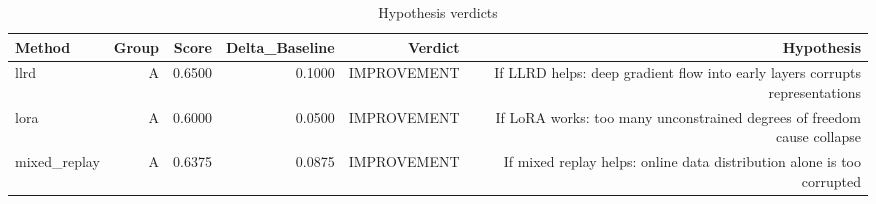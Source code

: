 \begin{table}[htbp]
\centering
\caption{Hypothesis verdicts}
\label{tab:hyp-verdicts}
\begin{tabular}{lrrrrr}
\toprule
\textbf{Method} & \textbf{Group} & \textbf{Score} & \textbf{Delta\_Baseline} & \textbf{Verdict} & \textbf{Hypothesis} \\
\midrule
llrd & A & 0.6500 & 0.1000 & IMPROVEMENT & If LLRD helps: deep gradient flow into early layers corrupts representations \\
lora & A & 0.6000 & 0.0500 & IMPROVEMENT & If LoRA works: too many unconstrained degrees of freedom cause collapse \\
mixed\_replay & A & 0.6375 & 0.0875 & IMPROVEMENT & If mixed replay helps: online data distribution alone is too corrupted \\
\bottomrule
\end{tabular}
\end{table}